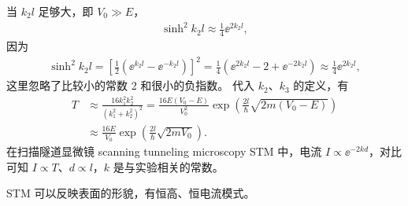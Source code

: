 当 $k_2l$ 足够大，即 $V_0 \gg E$，
\begin{align}
    \sinh^2 k_2l \approx \frac 14 \ee^{2k_2 l},
\end{align}
因为
\begin{align}
    \sinh^2 k_2 l = \left[\frac12\left(\ee^{k_2l} - \ee^{-k_2l}\right)\right]^2 = \frac14 \left(\ee^{2k_2 l} - 2 + \ee^{-2k_2 l}\right) \approx \frac 14 \ee^{2k_2 l},
\end{align}
这里忽略了比较小的常数 2 和很小的负指数。
代入 $k_2$、$k_3$ 的定义，有
\begin{align}
    T &\approx \frac{16 k_1^2 k_2^2}{(k_1^2 + k_2^2)^2} = \frac{16E(V_0 - E)}{V_0^2} \exp\left(\frac{2l}{\hbar}\sqrt{2m(V_0 - E)}\right) \\
    &\approx \frac{16 E}{V_0} \exp\left(\frac{2l}{\hbar}\sqrt{2m V_0}\right). 
\end{align}
在扫描隧道显微镜 scanning tunneling microscopy STM 中，电流 $I \propto \ee^{-2 k d}$，对比可知 $I \propto T$、$d\propto l$，$k$ 是与实验相关的常数。

STM 可以反映表面的形貌，有恒高、恒电流模式。

